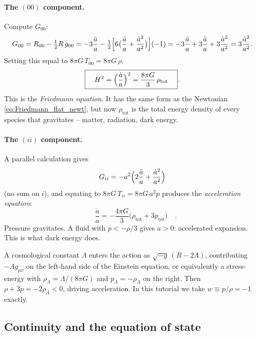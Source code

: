 \paragraph{The $(00)$ component.} Compute $G_{00}$:
\[
  G_{00} = R_{00} - \tfrac{1}{2} R\, g_{00} = -3\frac{\ddot a}{a} - \tfrac{1}{2}\Bigl[6\bigl(\frac{\ddot a}{a} + \frac{\dot a^2}{a^2}\bigr)\Bigr](-1)
        = -3\frac{\ddot a}{a} + 3\frac{\ddot a}{a} + 3\frac{\dot a^2}{a^2}
        = 3\frac{\dot a^2}{a^2}.
\]
Setting this equal to $8\pi G\, T_{00} = 8\pi G\, \rho$,
\begin{equation}
  \boxed{\quad H^2 = \Bigl(\frac{\dot a}{a}\Bigr)^2 = \frac{8\pi G}{3}\, \rho_\mathrm{tot}\quad}.
  \label{eq:Friedmann_GR}
\end{equation}
This is the \emph{Friedmann equation}. It has the same form as the Newtonian \cref{eq:Friedmann_flat_newt}, but now $\rho_\mathrm{tot}$ is the total energy density of every species that gravitates -- matter, radiation, dark energy.

\paragraph{The $(ii)$ component.} A parallel calculation gives
\[
  G_{ii} = -a^2\Bigl(2\frac{\ddot a}{a} + \frac{\dot a^2}{a^2}\Bigr)
\]
(no sum on $i$), and equating to $8\pi G\, T_{ii} = 8\pi G\, a^2 p$ produces the \emph{acceleration equation}:
\begin{equation}
  \boxed{\quad \frac{\ddot a}{a} = -\frac{4\pi G}{3}\bigl(\rho_\mathrm{tot} + 3 p_\mathrm{tot}\bigr)\quad}.
  \label{eq:acceleration}
\end{equation}
Pressure gravitates. A fluid with $p < -\rho/3$ gives $\ddot a > 0$: accelerated expansion. This is what dark energy does.

\begin{aside}
A cosmological constant $\Lambda$ enters the action as $\sqrt{-g}\, (R - 2\Lambda)$, contributing $-\Lambda g_{\mu\nu}$ on the left-hand side of the Einstein equation, or equivalently a stress-energy with $\rho_\Lambda = \Lambda/(8\pi G)$ and $p_\Lambda = -\rho_\Lambda$ on the right. Then $\rho + 3p = -2\rho_\Lambda < 0$, driving acceleration. In this tutorial we take $w \equiv p/\rho = -1$ exactly.
\end{aside}

\subsection{Continuity and the equation of state}

